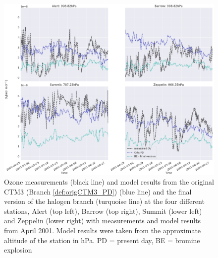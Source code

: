 \begin{figure}[h]
    \centering
    \includegraphics[width = \linewidth]{Chapter6_Results/images/ozone_2001_AprMay_step5.png}
    \caption{Ozone measurements (black line) and model results from the original CTM3 (Branch \ref{def:origCTM3_PD}) (blue line) and the final version of the halogen branch (turquoise line) at the four different stations, Alert (top left), Barrow (top right), Summit (lower left) and Zeppelin (lower right) with measurements and model results from April 2001. Model results were taken from the approximate altitude of the station in hPa. PD = present day, BE = bromine explosion}
    \label{fig:AprMar_step5}
\end{figure}